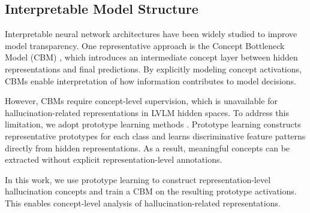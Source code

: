 \subsection{Interpretable Model Structure}

Interpretable neural network architectures have been widely studied to improve model transparency. One representative approach is the Concept Bottleneck Model (CBM) \citep{koh2020concept}, which introduces an intermediate concept layer between hidden representations and final predictions. By explicitly modeling concept activations, CBMs enable interpretation of how information contributes to model decisions.

However, CBMs require concept-level supervision, which is unavailable for hallucination-related representations in LVLM hidden spaces. To address this limitation, we adopt prototype learning methods \citep{singh2021these, kim2022vit}. Prototype learning constructs representative prototypes for each class and learns discriminative feature patterns directly from hidden representations. As a result, meaningful concepts can be extracted without explicit representation-level annotations.

In this work, we use prototype learning to construct representation-level hallucination concepts and train a CBM on the resulting prototype activations. This enables concept-level analysis of hallucination-related representations.

